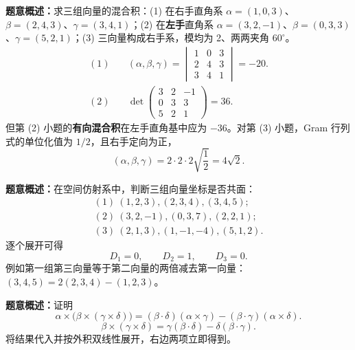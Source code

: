 \textbf{题意概述：}求三组向量的混合积：(1) 在右手直角系 $\alpha=(1,0,3)$、$\beta=(2,4,3)$、$\gamma=(3,4,1)$；(2) 在\textbf{左手}直角系 $\alpha=(3,2,-1)$、$\beta=(0,3,3)$、$\gamma=(5,2,1)$；(3) 三向量构成右手系，模均为 2、两两夹角 $60^\circ$。
\begin{align*}
(1)\quad&(\alpha,\beta,\gamma)
=\begin{vmatrix}1&0&3\\2&4&3\\3&4&1\end{vmatrix}=-20.\\
(2)\quad&\det\begin{pmatrix}3&2&-1\\0&3&3\\5&2&1\end{pmatrix}=36.
\end{align*}
但第 (2) 小题的\textbf{有向混合积}在左手直角基中应为 $-36$。对第 (3) 小题，Gram 行列式的单位化值为 $1/2$，且右手定向为正，
\[
(\alpha,\beta,\gamma)=2\cdot2\cdot2\sqrt{\frac12}=4\sqrt2.
\]

\textbf{题意概述：}在空间仿射系中，判断三组向量坐标是否共面：
\[
\begin{array}{l}
(1)\ (1,2,3),(2,3,4),(3,4,5);\\
(2)\ (3,2,-1),(0,3,7),(2,2,1);\\
(3)\ (2,1,3),(1,-1,-4),(5,1,2).
\end{array}
\]
逐个展开可得
\[
D_1=0,\qquad D_2=1,\qquad D_3=0.
\]
例如第一组第三向量等于第二向量的两倍减去第一向量：$(3,4,5)=2(2,3,4)-(1,2,3)$。

\textbf{题意概述：}证明
\[
\alpha\times\bigl(\beta\times(\gamma\times\delta)\bigr)
=(\beta\cdot\delta)(\alpha\times\gamma)
-(\beta\cdot\gamma)(\alpha\times\delta).
\]
\[
\beta\times(\gamma\times\delta)
=\gamma(\beta\cdot\delta)-\delta(\beta\cdot\gamma).
\]
将结果代入并按外积双线性展开，右边两项立即得到。

